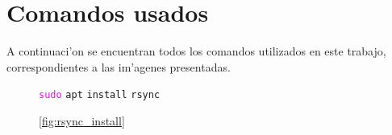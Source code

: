 \documentclass[11pt]{article}
\newcommand{\imagecaption}[1]{\vspace{-7pt}\caption*{\char91\ref{fig:#1}\char93}}
\newcommand{\codetext}[2]{\large\texttt{\textcolor{#1}{#2}}}
\begin{document}
	\section{Comandos usados}
		A continuaci'on se encuentran todos los comandos utilizados en este trabajo, correspondientes a las im'agenes presentadas.

		\begin{figure}[H]
			\centering
			\begin{code-box}
				\codetext{fuchsia}{sudo} \codetext{light-blue}{apt} \codetext{light-orange}{install} \codetext{light-red}{rsync}
			\end{code-box}
			\imagecaption{rsync_install}
		\end{figure}
\end{document}
